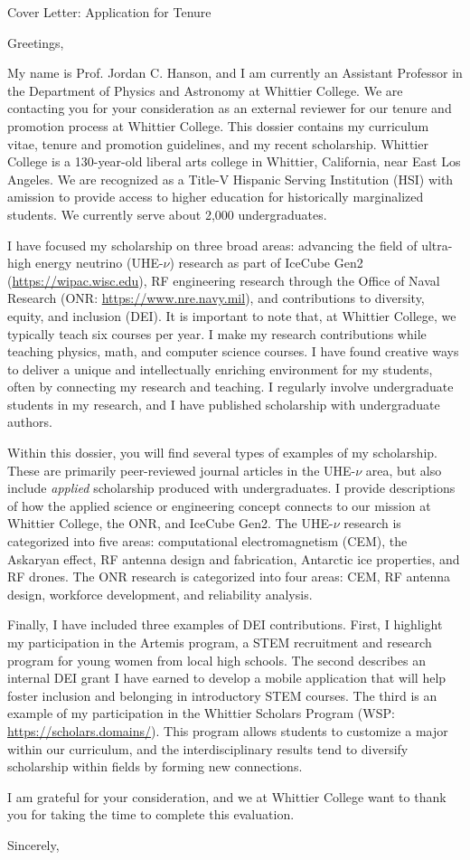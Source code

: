 \documentclass[11pt, a4paper]{letter}
\begin{document}
\begin{letter}{
	Cover Letter: Application for Tenure
}

\opening{Greetings,}

My name is Prof. Jordan C. Hanson, and I am currently an Assistant Professor in the Department of Physics and Astronomy at Whittier College.  We are contacting you for your consideration as an external reviewer for our tenure and promotion process at Whittier College.  This dossier contains my curriculum vitae, tenure and promotion guidelines, and my recent scholarship.  Whittier College is a 130-year-old liberal arts college in Whittier, California, near East Los Angeles.  We are recognized as a Title-V Hispanic Serving Institution (HSI) with amission to provide access to higher education for historically marginalized students.  We currently serve about 2,000 undergraduates.

I have focused my scholarship on three broad areas: advancing the field of ultra-high energy neutrino (UHE-$\nu$) research as part of IceCube Gen2 (\url{https://wipac.wisc.edu}), RF engineering research through the Office of Naval Research (ONR: \url{https://www.nre.navy.mil}), and contributions to diversity, equity, and inclusion (DEI).  It is important to note that, at Whittier College, we typically teach six courses per year. I make my research contributions while teaching physics, math, and computer science courses.  I have found creative ways to deliver a unique and intellectually enriching environment for my students, often by connecting my research and teaching. I regularly involve undergraduate students in my research, and I have published scholarship with undergraduate authors.

Within this dossier, you will find several types of examples of my scholarship.  These are primarily peer-reviewed journal articles in the UHE-$\nu$ area, but also include \textit{applied} scholarship produced with undergraduates.  I provide descriptions of how the applied science or engineering concept connects to our mission at Whittier College, the ONR, and IceCube Gen2.  The UHE-$\nu$ research is categorized into five areas: computational electromagnetism (CEM), the Askaryan effect, RF antenna design and fabrication, Antarctic ice properties, and RF drones.  The ONR research is categorized into four areas: CEM, RF antenna design, workforce development, and reliability analysis.

Finally, I have included three examples of DEI contributions.  First, I highlight my participation in the Artemis program, a STEM recruitment and research program for young women from local high schools.  The second describes an internal DEI grant I have earned to develop a mobile application that will help foster inclusion and belonging in introductory STEM courses.  The third is an example of my participation in the Whittier Scholars Program (WSP: \url{https://scholars.domains/}).  This program allows students to customize a major within our curriculum, and the interdisciplinary results tend to diversify scholarship within fields by forming new connections.

I am grateful for your consideration, and we at Whittier College want to thank you for taking the time to complete this evaluation.

\closing{Sincerely,}
\end{letter}
\end{document}
